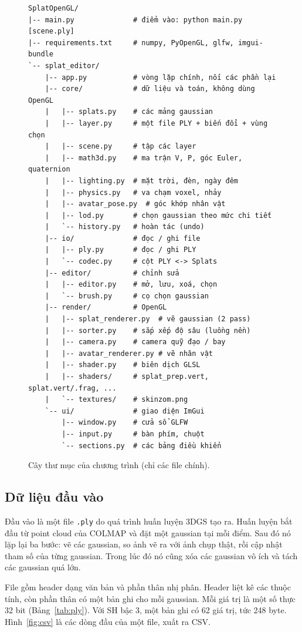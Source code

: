 \documentclass[9pt,twocolumn,a4paper]{extarticle}
\newcommand{\code}[1]{\texttt{#1}}
\begin{document}
\begin{figure}[H]
\centering
\begin{Verbatim}[fontsize=\fontsize{5.6}{6.6}\selectfont,frame=single]
SplatOpenGL/
|-- main.py              # điểm vào: python main.py [scene.ply]
|-- requirements.txt     # numpy, PyOpenGL, glfw, imgui-bundle
`-- splat_editor/
    |-- app.py           # vòng lặp chính, nối các phần lại
    |-- core/            # dữ liệu và toán, không dùng OpenGL
    |   |-- splats.py    # các mảng gaussian
    |   |-- layer.py     # một file PLY + biến đổi + vùng chọn
    |   |-- scene.py     # tập các layer
    |   |-- math3d.py    # ma trận V, P, góc Euler, quaternion
    |   |-- lighting.py  # mặt trời, đèn, ngày đêm
    |   |-- physics.py   # va chạm voxel, nhảy
    |   |-- avatar_pose.py  # góc khớp nhân vật
    |   |-- lod.py       # chọn gaussian theo mức chi tiết
    |   `-- history.py   # hoàn tác (undo)
    |-- io/              # đọc / ghi file
    |   |-- ply.py       # đọc / ghi PLY
    |   `-- codec.py     # cột PLY <-> Splats
    |-- editor/          # chỉnh sửa
    |   |-- editor.py    # mở, lưu, xoá, chọn
    |   `-- brush.py     # cọ chọn gaussian
    |-- render/          # OpenGL
    |   |-- splat_renderer.py  # vẽ gaussian (2 pass)
    |   |-- sorter.py    # sắp xếp độ sâu (luồng nền)
    |   |-- camera.py    # camera quỹ đạo / bay
    |   |-- avatar_renderer.py # vẽ nhân vật
    |   |-- shader.py    # biên dịch GLSL
    |   |-- shaders/     # splat_prep.vert, splat.vert/.frag, ...
    |   `-- textures/    # skinzom.png
    `-- ui/              # giao diện ImGui
        |-- window.py    # cửa sổ GLFW
        |-- input.py     # bàn phím, chuột
        `-- sections.py  # các bảng điều khiển
\end{Verbatim}
\caption{Cây thư mục của chương trình (chỉ các file chính).}
\label{fig:tree}
\end{figure}

\subsection{Dữ liệu đầu vào}
\label{sec:input}
Đầu vào là một file \code{.ply} do quá trình huấn luyện 3DGS tạo ra. Huấn luyện bắt đầu từ point cloud của COLMAP và đặt một gaussian tại mỗi điểm. Sau đó nó lặp lại ba bước: vẽ các gaussian, so ảnh vẽ ra với ảnh chụp thật, rồi cập nhật tham số của từng gaussian. Trong lúc đó nó cũng xóa các gaussian vô ích và tách các gaussian quá lớn.

File gồm header dạng văn bản và phần thân nhị phân. Header liệt kê các thuộc tính, còn phần thân có một bản ghi cho mỗi gaussian. Mỗi giá trị là một số thực 32 bit (Bảng~\ref{tab:ply}). Với SH bậc 3, một bản ghi có 62 giá trị, tức 248 byte. Hình~\ref{fig:csv} là các dòng đầu của một file, xuất ra CSV.
\end{document}
